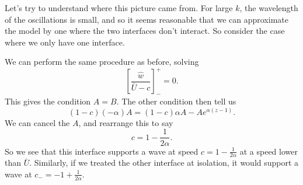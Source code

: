 \documentclass[a4paper]{article}
\begin{document}
Let's try to understand where this picture came from. For large $k$, the wavelength of the oscillations is small, and so it seems reasonable that we can approximate the model by one where the two interfaces don't interact. So consider the case where we only have one interface.
\begin{center}
\end{center}
We can perform the same procedure as before, solving
\[
  \left[\frac{\hat{w}}{\bar{U} - c}\right]_-^+ = 0.
\]
This gives the condition $A = B$. The other condition then tell us
\[
  (1 - c) (-\alpha) A = (1 - c)\alpha A - Ae^{\alpha(z - 1)}.
\]
We can cancel the $A$, and rearrange this to say
\[
  c = 1 - \frac{1}{2\alpha}.
\]
So we see that this interface supports a wave at speed $c = 1 - \frac{1}{2\alpha}$ at a speed lower than $\bar{U}$. Similarly, if we treated the other interface at isolation, it would support a wave at $c_- = -1 + \frac{1}{2\alpha}$.
\end{document}
